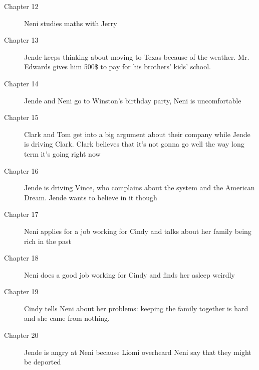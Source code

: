 \documentclass{article}
\begin{document}
\begin{description}
 \item[Chapter 12] Neni studies maths with Jerry
 \item[Chapter 13] Jende keeps thinking about moving to Texas because of the weather. Mr. Edwards gives him 500\$ to pay for his brothers' kids' school.
 \item[Chapter 14] Jende and Neni go to Winston's birthday party, Neni is uncomfortable
 \item[Chapter 15] Clark and Tom get into a big argument about their company while Jende is driving Clark. Clark believes that it's not gonna go well the way long term it's going right now
 \item[Chapter 16] Jende is driving Vince, who complains about the system and the American Dream. Jende wants to believe in it though
 \item[Chapter 17] Neni applies for a job working for Cindy and talks about her family being rich in the past
 \item[Chapter 18] Neni does a good job working for Cindy and finds her asleep weirdly
 \item[Chapter 19] Cindy tells Neni about her problems: keeping the family together is hard and she came from nothing. 
 \item[Chapter 20] Jende is angry at Neni because Liomi overheard Neni say that they might be deported
\end{description}   
\end{document}
